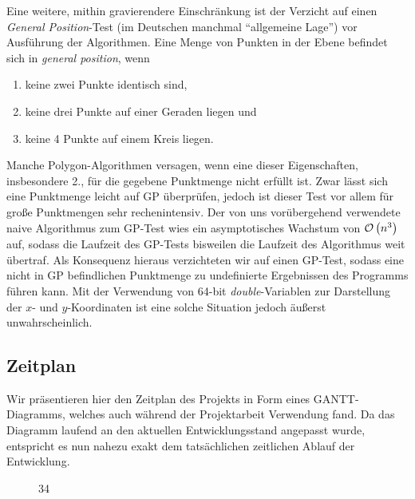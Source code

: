 Eine weitere, mithin gravierendere Einschränkung ist der Verzicht auf einen \emph{General Position}-Test (im Deutschen manchmal \enquote{allgemeine Lage}) vor Ausführung der Algorithmen. Eine Menge von Punkten in der Ebene befindet sich in \emph{general position}, wenn
\begin{enumerate}
\item keine zwei Punkte identisch sind,
\item keine drei Punkte auf einer Geraden liegen und
\item keine 4 Punkte auf einem Kreis liegen.
\end{enumerate}
Manche Polygon-Algorithmen versagen, wenn eine dieser Eigenschaften, insbesondere 2., für die gegebene Punktmenge nicht erfüllt ist. Zwar lässt sich eine Punktmenge leicht auf GP überprüfen, jedoch ist dieser Test vor allem für große Punktmengen sehr rechenintensiv. Der von uns vorübergehend verwendete naive Algorithmus zum GP-Test wies ein asymptotisches Wachstum von $\mathcal{O}\left(n^3\right)$ auf, sodass die Laufzeit des GP-Tests bisweilen die Laufzeit des Algorithmus weit übertraf. Als Konsequenz hieraus verzichteten wir auf einen GP-Test, sodass eine nicht in GP befindlichen Punktmenge zu undefinierte Ergebnissen des Programms führen kann. Mit der Verwendung von 64-bit \emph{double}-Variablen zur Darstellung der $x$- und $y$-Koordinaten ist eine solche Situation jedoch äußerst unwahrscheinlich.

\subsection{Zeitplan}
Wir präsentieren hier den Zeitplan des Projekts in Form eines GANTT-Diagramms, welches auch während der Projektarbeit Verwendung fand. Da das Diagramm laufend an den aktuellen Entwicklungsstand angepasst wurde, entspricht es nun nahezu exakt dem tatsächlichen zeitlichen Ablauf der Entwicklung.

\begin{figure}[h]
\begin{center}
\begin{PstGanttChart}[yunit=2,ChartUnitIntervalName=Month,TaskUnitIntervalValue=30,TaskUnitType=Month,ChartShowIntervals]{3}{4}
\end{PstGanttChart}
\end{center}
\label{fig:gantt}
\end{figure}


